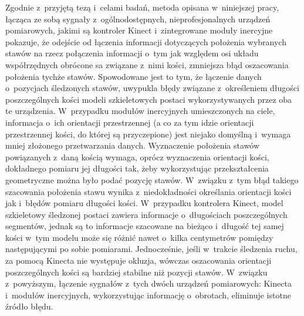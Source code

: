 Zgodnie z~przyjętą tezą i~celami badań, metoda opisana w~niniejszej pracy, łącząca ze sobą sygnały z~ogólnodostępnych, nieprofesjonalnych urządzeń pomiarowych, jakimi są kontroler Kinect i~zintegrowane moduły inercyjne pokazuje, że odejście od łączenia informacji dotyczących położenia wybranych stawów na rzecz połączenia informacji o~tym jak względem osi układu współrzędnych obrócone sa związane z~nimi kości, zmniejsza błąd oszacowania położenia tychże stawów. Spowodowane jest to tym, że łączenie danych o~pozycjach śledzonych stawów, uwypukla błędy związane z~określeniem długości poszczególnych kości modeli szkieletowych postaci wykorzystywanych przez oba te urządzenia. W~przypadku modułów inercyjnych umieszczonych na ciele, informacja o~ich orientacji przestrzennej (a co za tym idzie orientacji przestrzennej kości, do której są przyczepione) jest niejako domyślną i~wymaga mniej złożonego przetwarzania danych. Wyznaczenie położenia stawów powiązanych z~daną kością wymaga, oprócz wyznaczenia orientacji kości, dokładnego pomiaru jej długości tak, żeby wykorzystując przekształcenia geometryczne można było podać pozycję stawów. W~związku z~tym błąd takiego szacowania położenia stawu wynika z~niedokładności określania orientacji kości jak i~błędów pomiaru długości kości. W~przypadku kontrolera Kinect, model szkieletowy śledzonej postaci zawiera informacje o~długościach poszczególnych segmentów, jednak są to informacje szacowane na bieżąco i~długość tej samej kości w~tym modelu może się różnić nawet o~kilka centymetrów pomiędzy następującymi po sobie pomiarami. Jednocześnie, jeśli w~trakcie śledzenia ruchu, za pomocą Kinecta nie występuje okluzja, wówczas oszacowania orientacji poszczególnych kości są bardziej stabilne niż pozycji stawów. W~związku z~powyższym, łączenie sygnałów z~tych dwóch urządzeń pomiarowych: Kinecta i~modułów inercyjnych, wykorzystując informację o~obrotach, eliminuje istotne źródło błędu.\\

